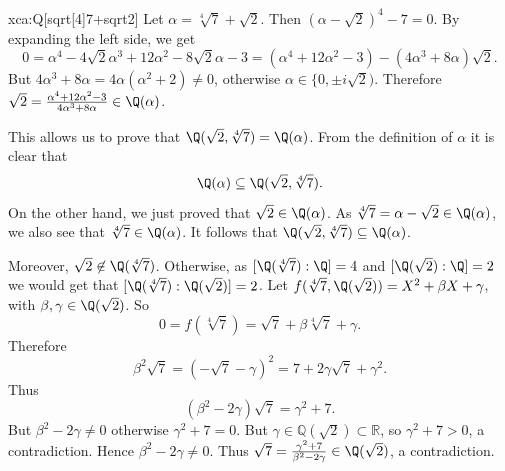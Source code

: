 \begin{sol}{xca:Q[sqrt[4]{7}+sqrt{2}]}
Let $\alpha=\sqrt[4]{7}+\sqrt{2}$. Then $(\alpha - \sqrt{2})^4 -7 = 0$.
By expanding the left side, we get
\[
0  =\alpha^4 - 4\sqrt{2}\alpha^3 + 12 \alpha^2 - 8\sqrt{2}\alpha - 3 
 = (\alpha^4 + 12\alpha^2 - 3) -  (4 \alpha^3 + 8 \alpha )\sqrt{2}.
\]
But $4 \alpha^3 + 8 \alpha = 4\alpha (\alpha^2+2) \neq 0$, otherwise $\alpha\in\{0,\pm i\sqrt{2})$.
Therefore $\sqrt{2}=\frac{\alpha^4 + 12\alpha^2 - 3}{4 \alpha^3 + 8 \alpha}\in \Q(\alpha) $.

This allows us to prove that $\Q(\sqrt{2} , \sqrt[4]{7}) = \Q(\alpha)$.
From the definition of $\alpha$ it is clear that 
\[
\Q(\alpha) \subseteq \Q(\sqrt{2} , \sqrt[4]{7}).
\]
On the other hand, we just proved that $\sqrt{2} \in \Q(\alpha)$.
As $\sqrt[4]{7} = \alpha - \sqrt{2} \in \Q(\alpha)$,
we also see that $\sqrt[4]{7} \in \Q(\alpha)$.
It follows that $\Q(\sqrt{2} , \sqrt[4]{7}) \subseteq \Q(\alpha)$.

Moreover, $\sqrt{2}\not\in \Q(\sqrt[4]{7})$. 
Otherwise, as $[\Q(\sqrt[4]{7}):\Q] = 4$ and $[\Q(\sqrt{2}):\Q] = 2$
we would get that $[\Q(\sqrt[4]{7}):\Q(\sqrt{2})] = 2$.
Let $f(\sqrt[4]{7},\Q(\sqrt{2})) = X^2 + \beta X + \gamma$,
with $\beta, \gamma \in \Q(\sqrt{2})$. 
So 
$$0=f(\sqrt[4]{7})=\sqrt{7} + \beta \sqrt[4]{7} + \gamma.$$
Therefore 
$$\beta^2 \sqrt{7}  = (- \sqrt{7} - \gamma)^2 =7 + 2\gamma \sqrt{7}  + \gamma^2.$$
Thus 
\[
(\beta^2 - 2 \gamma)\sqrt{7}= \gamma^2 + 7.
\]
But $\beta^2 - 2 \gamma\neq 0$ 
otherwise
$\gamma^2+7=0$.
But $\gamma \in \mathbb{Q}(\sqrt{2}) \subset \mathbb{R}$, 
so $\gamma^2+7>0$, a contradiction.
Hence $\beta^2-2\gamma \neq 0$.
Thus 
$\sqrt{7} = \frac{\gamma^2 + 7}{\beta^2 - 2 \gamma} \in \Q(\sqrt{2})$, a contradiction.


\end{sol}
